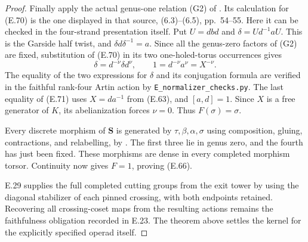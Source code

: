 \begin{proof}
Finally apply the actual genus-one relation
(G2) of \cite[Theorem 3.18]{ET_BonattoRobertson2026}.
Its calculation for (E.70) is the one displayed
in that source, (6.3)--(6.5), pp.~54--55.
Here it can be checked in the four-strand
presentation itself.  Put
$U=dbd$ and $\delta=Ud^{-1}aU$.
This is the Garside half twist, and
$\delta d\delta^{-1}=a$.
Since all the genus-zero factors of (G2) are
fixed, substitution of (E.70) in its two
one-holed-torus occurrences gives
\[
              \delta=d^{-\nu}\delta d^\nu,
       \qquad 1=d^{-\nu}a^\nu=X^{-\nu}.                 \tag{E.71}
\]
The equality of the two expressions for
$\delta$ and its conjugation formula are
verified in the faithful rank-four Artin action
by \texttt{E\_normalizer\_checks.py}.
The last equality of (E.71) uses $X=da^{-1}$
from (E.63), and $[a,d]=1$.
Since $X$ is a free generator of $K$, its
abelianization forces $\nu=0$.
Thus $F(\sigma)=\sigma$.

Every discrete morphism of $\mathbf S$ is
generated by $\tau,\beta,\alpha,\sigma$ using
composition, gluing, contractions, and
relabelling, by
\cite[Proposition 3.8 and its proof]{ET_BonattoRobertson2026}.
The first three lie in genus zero, and the
fourth has just been fixed.  These morphisms
are dense in every completed morphism torsor.
Continuity now gives $F=1$, proving (E.66).

E.29 supplies the full completed cutting groups
from the exit tower by using the diagonal
stabilizer of each pinned crossing, with both
endpoints retained.  Recovering all crossing-coset
maps from the resulting actions remains the
faithfulness obligation recorded in E.23.
The theorem above
settles the kernel for the explicitly specified
operad itself.
\end{proof}

